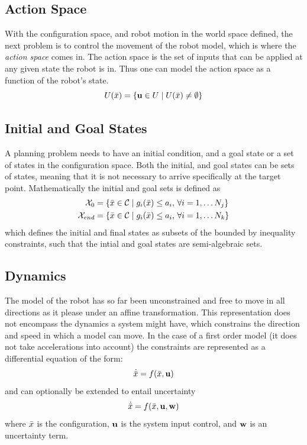\subsection{Action Space}

With the configuration space, and robot motion in the world space defined, the
next problem is to control the movement of the robot model, which is where the
\textit{action space} comes in. The action space is the set of inputs that can
be applied at any given state the robot is in. Thus one can model the action
space as a function of the robot's state.
\[
  U(\bar{x}) = \lbrace\mathbf{u} \in U \mid U(\bar{x})
    \neq \emptyset \rbrace
\]

\subsection{Initial and Goal States}

A planning problem needs to have an initial condition, and a goal state or a set
of states in the configuration space. Both the initial, and goal states can be
sets of states, meaning that it is not necessary to arrive specifically at the
target point. Mathematically the initial and goal sets is defined as
\begin{align*}
  \mathcal{X}_0 &= \lbrace \bar{x} \in \mathcal{C}{} \mid g_i(\bar{x}) \leq a_i,
                  \, \forall i = 1,\ldots N_j\rbrace \\
  \mathcal{X}_{end} &= \lbrace \bar{x} \in \mathcal{C}{} \mid g_i(\bar{x}) \leq
                      a_i, \, \forall i = 1,\ldots N_k\rbrace
\end{align*}
which defines the initial and final states as subsets of the
\modelconfigurationspace{} bounded by inequality constraints, such that the
intial and goal states are semi-algebraic sets.

\subsection{Dynamics}

The model of the robot has so far been unconstrained and free to move in all
directions as it please under an affine transformation. This representation does
not encompass the dynamics a system might have, which constrains the direction
and speed in which a model can move. In the case of a first order model (\ie it
does not take accelerations into account) the constraints are represented as a
differential equation of the form:
\[
  \dot{\bar{x}} = f(\bar{x},\mathbf{u})
\]
and can optionally be extended to entail uncertainty
\[
  \dot{\bar{x}} = f(\bar{x},\mathbf{u},\mathbf{w})
\]
where \(\bar{x}\) is the configuration, \(\mathbf{u}\) is the system input control, and
\(\mathbf{w}\) is an uncertainty term.

